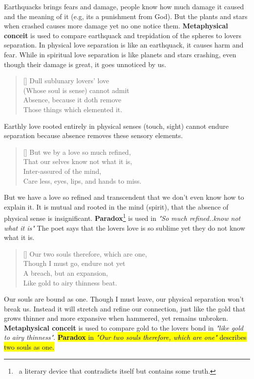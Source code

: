 \documentclass[12pt, a4paper]{article}
\begin{document}
Earthquacks brings fears and damage, people know how much 
damage it caused and the meaning of it (e.g, its a punishment from God).
But the plants and stars when crashed causes more damage yet no one notice them.
\textbf{Metaphysical conceit} is used to compare earthquack and trepidation of the spheres
to lovers separation. In physical love separation is like an earthquack, it causes harm and fear.
While in spiritual love separation is like planets and stars crashing, even though their damage is 
great, it goes unnoticed by us.

\begin{verse}[\versewidth]
{\fontverse
Dull sublunary lovers' love\\
\vin (Whose soul is sense) cannot admit\\
Absence, because it doth remove\\
\vin Those things which elemented it.
} 
\end{verse}

Earthly love rooted entirely in physical senses (touch, sight) 
cannot endure separation because absence removes these sensory elements.

\begin{verse}[\versewidth]
{\fontverse
But we by a love so much refined,\\
\vin That our selves know not what it is,\\
Inter-assured of the mind,\\
\vin Care less, eyes, lips, and hands to miss. 
} 
\end{verse}

But we have a love so refined and transcendent that we don't even know how to explain it.
It is mutual and rooted in the mind (spirit), that the absence of 
physical sense is insignificant. \textbf{Paradox}\footnote{
\, a literary device that contradicts itself but contains some truth.} 
is used in \textit{"So much refined..know not what it is"}
The poet says that the lovers love is so sublime yet they do not know what it is.

\begin{verse}[\versewidth]
{\fontverse
Our two souls therefore, which are one,\\
\vin Though I must go, endure not yet\\
A breach, but an expansion,\\
\vin Like gold to airy thinness beat. 
} 
\end{verse}

Our souls are bound as one. Though I must leave, our physical separation won’t break us.
Instead it will stretch and refine our connection, just like the gold that grows thinner and more 
expansive when hammered, yet remains unbroken. \textbf{Metaphysical conceit} is used to compare 
gold to the lovers bond in \textit{"like gold to airy thinness"}. \hl{\textbf{Paradox}
in \textit{"Our two souls therefore, which are one"} describes two souls as one.}
\end{document}
